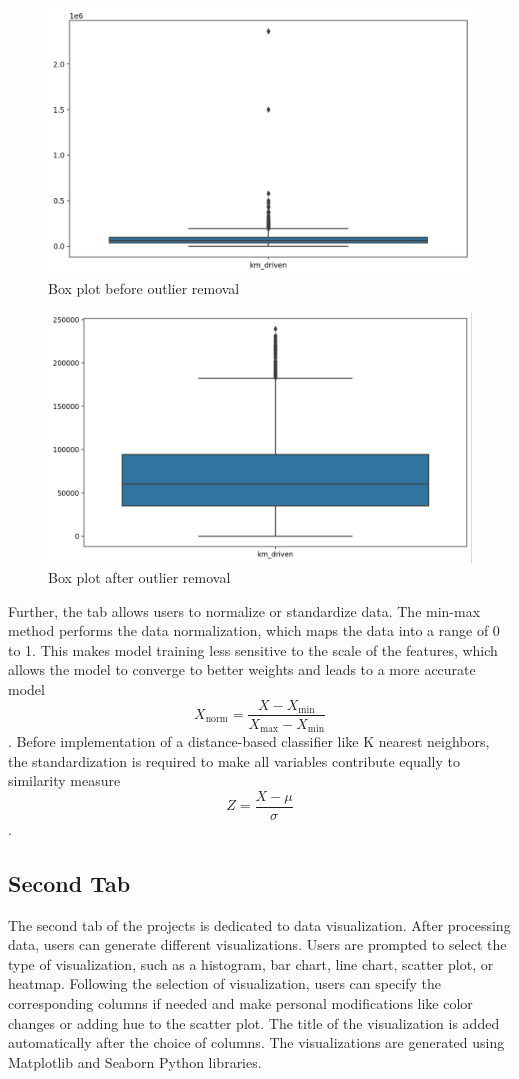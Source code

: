 \documentclass[a4paper,twocolumn,12pt]{article}
\begin{document}
\begin{figure}[h]
\centering
\includegraphics[width = .4\textwidth]{Figuras/Before Boxplot.png} 
\caption{Box plot before outlier removal}
\end{figure}
    
\begin{figure}[h]
\centering
\includegraphics[width = .4\textwidth]{Figuras/After Boxplot.png}
\caption{Box plot after outlier removal}
\end{figure}

Further, the tab allows users to normalize or standardize data. The min-max method performs the data normalization, which maps the data into a range of 0 to 1. This makes model training less sensitive to the scale of the features, which allows the model to converge to better weights and leads to a more accurate model\cite{normalization} \[X_{\text{norm}} = \frac{X - X_{\text{min}}}{X_{\text{max}} - X_{\text{min}}}\]. Before implementation of a distance-based classifier like K nearest neighbors, the standardization is required to make all variables contribute equally to similarity measure \cite{standardization} \[Z = \frac{X-\mu}{\sigma}\]. 

\subsection{Second Tab}


The second tab of the projects is dedicated to data visualization. After processing data, users can generate different visualizations. Users are prompted to select the type of visualization, such as a histogram, bar chart, line chart, scatter plot, or heatmap. Following the selection of visualization, users can specify the corresponding columns if needed and make personal modifications like color changes or adding hue to the scatter plot. The title of the visualization is added automatically after the choice of columns. The visualizations are generated using Matplotlib and Seaborn Python libraries. 
\end{document}

